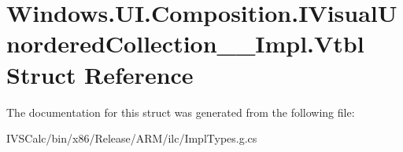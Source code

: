 \hypertarget{struct_windows_1_1_u_i_1_1_composition_1_1_i_visual_unordered_collection_____impl_1_1_vtbl}{}\section{Windows.\+U\+I.\+Composition.\+I\+Visual\+Unordered\+Collection\+\_\+\+\_\+\+Impl.\+Vtbl Struct Reference}
\label{struct_windows_1_1_u_i_1_1_composition_1_1_i_visual_unordered_collection_____impl_1_1_vtbl}


The documentation for this struct was generated from the following file\+:\begin{DoxyCompactItemize}
\item 
I\+V\+S\+Calc/bin/x86/\+Release/\+A\+R\+M/ilc/Impl\+Types.\+g.\+cs\end{DoxyCompactItemize}
